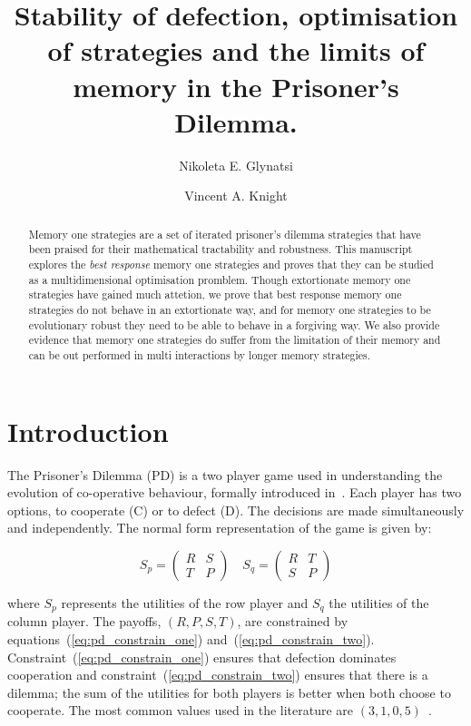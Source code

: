 \documentclass[10pt]{article}
\title{Stability of defection, optimisation of strategies and the limits of
       memory in the Prisoner's Dilemma.}
\author{Nikoleta E. Glynatsi \and Vincent A. Knight}
\date{}
\begin{document}
\maketitle

\begin{abstract}
    Memory one strategies are a set of iterated prisoner’s dilemma strategies
    that have been praised
    for their mathematical tractability and robustness. This manuscript explores
    the \textit{best response} memory one strategies and proves that they can be
    studied as a multidimensional optimisation promblem. Though extortionate memory
    one strategies have gained much attetion, we prove that best response memory
    one strategies do not behave in an extortionate way, and for 
    memory one strategies to be evolutionary robust they need to be able to behave
    in a forgiving way. We also provide evidence that memory one strategies do suffer
    from the limitation of their memory and can be out performed in multi interactions
    by longer memory strategies.
\end{abstract}

\section{Introduction}\label{section:introduction}

The Prisoner's Dilemma (PD) is a two player game used in understanding the
evolution of co-operative behaviour, formally introduced in~\cite{Flood1958}.
Each player has two options, to cooperate (C) or to defect (D). The decisions
are made simultaneously and independently. The normal form representation of the
game is given by:

\begin{equation}\label{equ:pd_definition}
    S_p =
    \begin{pmatrix}
        R & S  \\
        T & P
    \end{pmatrix}
    \quad
    S_q =
    \begin{pmatrix}
        R & T  \\
        S & P
    \end{pmatrix}
\end{equation}

where \(S_p\) represents the utilities of the row player and \(S_q\) the
utilities of the column player. The payoffs, \((R, P, S, T)\), are constrained
by equations~(\ref{eq:pd_constrain_one}) and~(\ref{eq:pd_constrain_two}).
Constraint~(\ref{eq:pd_constrain_one}) ensures that
defection dominates cooperation and constraint~(\ref{eq:pd_constrain_two})
ensures that there is a dilemma; the sum of the utilities for both players is
better when both choose to cooperate. The most common values used in the literature are
\((3, 1, 0, 5)\)~\cite{Axelrod1981}.
\end{document}
